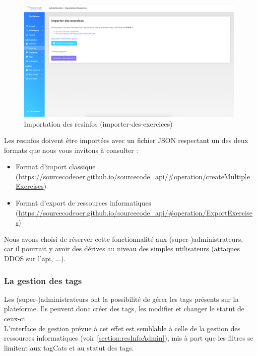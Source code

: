 \begin{figure}[H]
    \includegraphics[width=\textwidth,height=\textheight,keepaspectratio]{images/client/import.png}
    \centering
    \caption[SourceCode : importation des \glspl{resinfo}]{Importation des \glspl{resinfo} (importer-des-exercices)}
\end{figure}

Les \glspl{resinfo} doivent être importées avec un fichier JSON respectant un des deux formats que nous vous invitons à consulter :

\begin{itemize}
    \item Format d'import classique (\url{https://sourcecodeoer.github.io/sourcecode_api/#operation/createMultipleExercises})
    \item Format d'export de ressources informatiques (\url{https://sourcecodeoer.github.io/sourcecode_api/#operation/ExportExercises})
\end{itemize}

Nous avons choisi de réserver cette fonctionnalité aux (super-)administrateurs, car il pourrait y avoir des dérives au niveau des simples utilisateurs (attaques DDOS sur l'\gls{api}, ...).

\subsubsection{La gestion des \glspl{tag}}
\label{section:tagAdmin}

Les (super-)administrateurs ont la possibilité de gérer les \glspl{tag} présents sur la plateforme. Ils peuvent donc créer des \glspl{tag}, les modifier et changer le statut de ceux-ci.\\

L'interface de gestion prévue à cet effet est semblable à celle de la gestion des ressources informatiques (voir \ref{section:resInfoAdmin}), mis à part que les filtres se limitent aux \glspl{tagCat} et au statut des \glspl{tag}.

